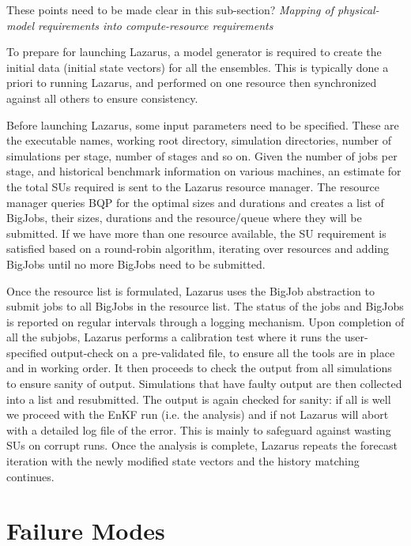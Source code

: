 \documentclass[conference,final]{IEEEtran}
\begin{document}
These points need to be made clear in this sub-section? \newline
 {\it Mapping of physical-model
  requirements into compute-resource requirements} \newline


To prepare for launching Lazarus, a model generator is required to create
the initial data (initial state vectors) for all the ensembles. This is typically
done a priori to running Lazarus, and performed on one resource then synchronized
against all others to ensure consistency.

Before launching Lazarus, some input parameters need to be specified.
These are the executable names, working root directory, simulation directories,
number of simulations per stage, number of stages and so on. Given 
the number of jobs per stage, and historical benchmark information on various
machines, an estimate for the total SUs required is sent to the Lazarus
resource manager. The resource manager queries BQP for the optimal sizes and durations
and creates a list of BigJobs, their sizes, durations and the resource/queue
where they will be submitted. If we have more than one resource available, the SU
requirement is satisfied based on a round-robin algorithm, iterating over
resources and adding BigJobs until no more BigJobs need to be submitted.

Once the resource list is formulated, Lazarus uses the BigJob abstraction to submit
jobs to all BigJobs in the resource list. The status of the jobs and BigJobs
is reported on regular intervals through a logging mechanism. Upon completion
of all the subjobs, Lazarus performs a calibration test where it runs
the user-specified output-check on a pre-validated file, to ensure all the tools
are in place and in working order. It then proceeds to check the output from all simulations to ensure sanity of output. Simulations that have faulty output are then
collected into a list and resubmitted. The output is again checked for sanity: if
all is well we proceed with the EnKF run (i.e. the analysis) and if not
Lazarus will abort with a detailed log file of the error. This is mainly to safeguard
against wasting SUs on corrupt runs. Once the analysis is complete,
Lazarus repeats the forecast iteration with the newly modified state vectors and
the history matching continues.



\section{Failure Modes}
\end{document}

